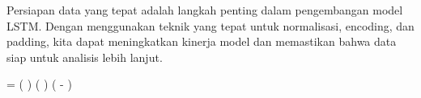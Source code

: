 \par Persiapan data yang tepat adalah langkah penting dalam pengembangan model LSTM. Dengan menggunakan teknik yang tepat untuk normalisasi, encoding, dan padding, kita dapat meningkatkan kinerja model dan memastikan bahwa data siap untuk analisis lebih lanjut.

\beginequation
{} = \left(  \right) \cdot \left(  \right) \cdot \exp \left( - \right)
\endequation

